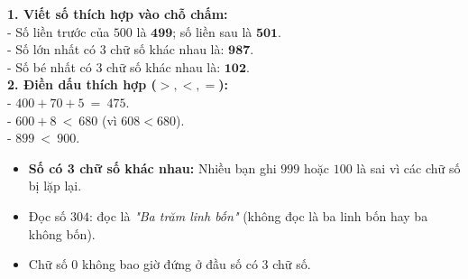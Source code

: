 \documentclass[10pt,a4paper]{article}
\begin{document}
\vspace{-1.5mm}
\noindent
\begin{minipage}[t]{0.49\textwidth}\vspace{0pt}
\begin{tcolorbox}[
  enhanced,
  colback=green!4!white,
  colframe=green!60!black,
  arc=2mm, boxrule=0.8pt,
  left=2mm, right=2mm, top=1.8mm, bottom=1.8mm,
  title={\footnotesize\bfseries\color{white}\faCheckCircle\ 4. Bài tập ôn luyện mẫu}
]
{\footnotesize
\textbf{1. Viết số thích hợp vào chỗ chấm:}\\
- Số liền trước của $500$ là $\mathbf{499}$; số liền sau là $\mathbf{501}$.\\
- Số lớn nhất có 3 chữ số khác nhau là: $\mathbf{987}$.\\
- Số bé nhất có 3 chữ số khác nhau là: $\mathbf{102}$.\\
\textbf{2. Điền dấu thích hợp ($>, <, =$):}\\
- $400 + 70 + 5\ \mathbf{=}\ 475$.\\
- $600 + 8\ \mathbf{<}\ 680$ (vì $608 < 680$).\\
- $899\ \mathbf{<}\ 900$.
}
\end{tcolorbox}
\end{minipage}
\hfill
\begin{minipage}[t]{0.49\textwidth}\vspace{0pt}
\begin{tcolorbox}[
  enhanced,
  colback=rose!4!white,
  colframe=rose!70!black,
  arc=2mm, boxrule=0.8pt,
  left=2mm, right=2mm, top=1.8mm, bottom=1.8mm,
  title={\footnotesize\bfseries\color{white}\faExclamationTriangle\ 5. Lỗi hay nhầm lẫn trong bài thi}
]
{\footnotesize
\begin{itemize}\setlength{\itemsep}{1.5pt}\setlength{\leftskip}{-2.5mm}
  \item \textbf{Số có 3 chữ số khác nhau:} Nhiều bạn ghi $999$ hoặc $100$ là sai vì các chữ số bị lặp lại.
  \item Đọc số $304$: đọc là \textit{"Ba trăm linh bốn"} (không đọc là ba linh bốn hay ba không bốn).
  \item Chữ số $0$ không bao giờ đứng ở đầu số có 3 chữ số.
\end{itemize}
}
\end{tcolorbox}
\end{minipage}
\end{document}
